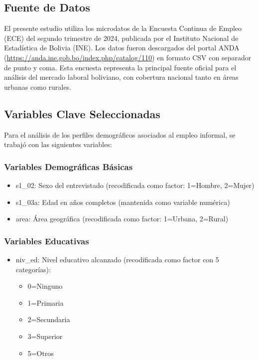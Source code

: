 \documentclass[Royal,times,sageh]{sagej}
\begin{document}
\subsection{Fuente de Datos}\label{fuente-de-datos}

El presente estudio utiliza los microdatos de la Encuesta Continua de
Empleo (ECE) del segundo trimestre de 2024, publicada por el Instituto
Nacional de Estadística de Bolivia (INE). Los datos fueron descargados
del portal ANDA (\url{https://anda.ine.gob.bo/index.php/catalog/110}) en
formato CSV con separador de punto y coma. Esta encuesta representa la
principal fuente oficial para el análisis del mercado laboral boliviano,
con cobertura nacional tanto en áreas urbanas como rurales.

\subsection{Variables Clave
Seleccionadas}\label{variables-clave-seleccionadas}

Para el análisis de los perfiles demográficos asociados al empleo
informal, se trabajó con las siguientes variables:

\subsubsection{Variables Demográficas
Básicas}\label{variables-demogruxe1ficas-buxe1sicas}

\begin{itemize}
\item
  s1\_02: Sexo del entrevistado (recodificada como factor: 1=Hombre,
  2=Mujer)
\item
  s1\_03a: Edad en años completos (mantenida como variable numérica)
\item
  area: Área geográfica (recodificada como factor: 1=Urbana, 2=Rural)
\end{itemize}

\subsubsection{Variables Educativas}\label{variables-educativas}

\begin{itemize}
\item
  niv\_ed: Nivel educativo alcanzado (recodificada como factor con 5
  categorías):

  \begin{itemize}
  \item
    0=Ninguno
  \item
    1=Primaria
  \item
    2=Secundaria
  \item
    3=Superior
  \item
    5=Otros
  \end{itemize}
\end{itemize}
\end{document}
